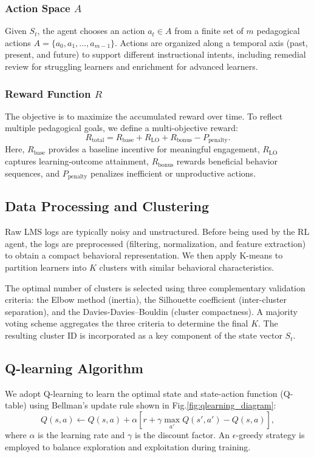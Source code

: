 \documentclass[conference]{IEEEtran}
\begin{document}
\subsubsection{Action Space $A$}
Given $S_t$, the agent chooses an action $a_t \in A$ from a finite set of $m$ pedagogical actions $A = \{a_0, a_1, \ldots, a_{m-1}\}$. Actions are organized along a temporal axis (past, present, and future) to support different instructional intents, including remedial review for struggling learners and enrichment for advanced learners.

\subsubsection{Reward Function $R$}
The objective is to maximize the accumulated reward over time. To reflect multiple pedagogical goals, we define a multi-objective reward:
\begin{equation}
R_{\text{total}} = R_{\text{base}} + R_{\text{LO}} + R_{\text{bonus}} - P_{\text{penalty}}.
\end{equation}
Here, $R_{\text{base}}$ provides a baseline incentive for meaningful engagement, $R_{\text{LO}}$ captures learning-outcome attainment, $R_{\text{bonus}}$ rewards beneficial behavior sequences, and $P_{\text{penalty}}$ penalizes inefficient or unproductive actions.

\subsection{Data Processing and Clustering}
Raw LMS logs are typically noisy and unstructured. Before being used by the RL agent, the logs are preprocessed (filtering, normalization, and feature extraction) to obtain a compact behavioral representation. We then apply K-means to partition learners into $K$ clusters with similar behavioral characteristics.

The optimal number of clusters is selected using three complementary validation criteria: the Elbow method (inertia), the Silhouette coefficient (inter-cluster separation), and the Davies-Davies–Bouldin (cluster compactness). A majority voting scheme aggregates the three criteria to determine the final $K$. The resulting cluster ID is incorporated as a key component of the state vector $S_t$.

\subsection{Q-learning Algorithm}
We adopt Q-learning to learn the optimal state and state-action function (Q-table) using Bellman’s update rule shown in Fig.\ref{fig:qlearning_diagram}:
\begin{equation}
Q(s, a) \leftarrow Q(s, a) + \alpha \left[r + \gamma \max_{a'} Q(s', a') - Q(s, a)\right],
\end{equation}
where $\alpha$ is the learning rate and $\gamma$ is the discount factor. An $\epsilon$-greedy strategy is employed to balance exploration and exploitation during training.
\end{document}
